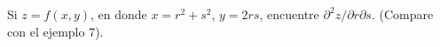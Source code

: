 \item Si $z = f(x, y)$, en donde $x = r^2 + s^2$, $y = 2rs$, encuentre $\partial^2 z/\partial r \partial s$. (Compare con el ejemplo 7).
